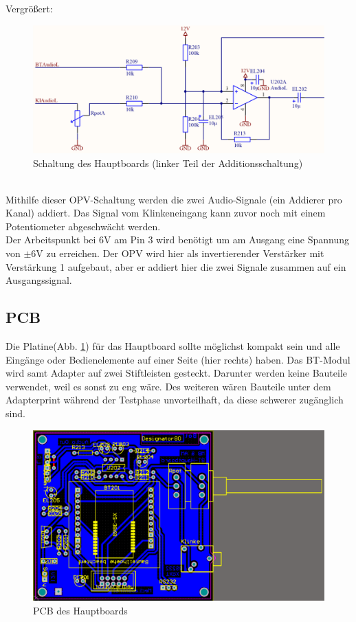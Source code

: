 Vergrößert:
\begin{figure} [h]
	\centering
	\includegraphics[width=1\textwidth]{schaltungen/hauptboard_sch2_zoom.png}
	\caption{Schaltung des Hauptboards (linker Teil der Additionsschaltung)}
\end{figure} \\
Mithilfe dieser OPV-Schaltung werden die zwei Audio-Signale (ein Addierer pro Kanal) addiert. Das Signal vom Klinkeneingang kann zuvor noch mit einem Potentiometer abgeschwächt werden.\\
Der Arbeitspunkt bei 6V am Pin 3 wird benötigt um am Ausgang eine Spannung von $\pm$6V zu erreichen. Der OPV wird hier als invertierender Verstärker mit Verstärkung 1 aufgebaut, aber er addiert hier die zwei Signale zusammen auf ein Ausgangssignal.

\subsection{PCB}
Die Platine(Abb. \ref {fig:abb3.6}) für das Hauptboard sollte möglichst kompakt sein und alle Eingänge oder Bedienelemente auf einer Seite (hier rechts) haben. Das BT-Modul wird samt Adapter auf zwei Stiftleisten gesteckt. Darunter werden keine Bauteile verwendet, weil es sonst zu eng wäre. Des weiteren wären Bauteile unter dem Adapterprint während der Testphase unvorteilhaft, da diese schwerer zugänglich sind.
\begin{figure} [h]
	\centering
	\includegraphics[width=1\textwidth]{schaltungen/hauptboard_pcb.png}
	\caption{PCB des Hauptboards}\label {fig:abb3.6}
\end{figure}
\newpage


